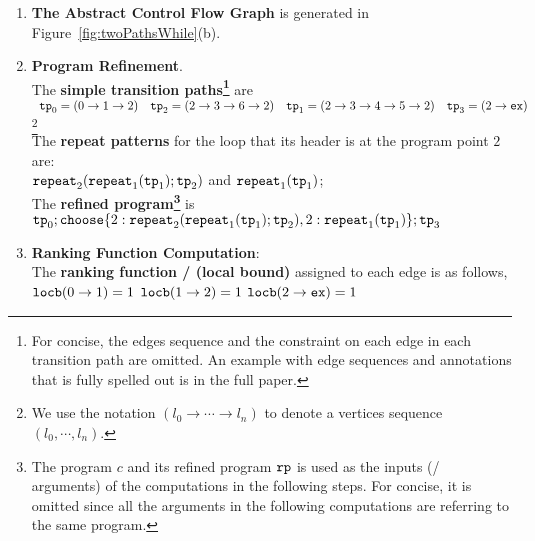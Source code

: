 \begin{enumerate}
  \item  \textbf{The Abstract Control Flow Graph} is generated in Figure~\ref{fig:twoPathsWhile}(b).

  \item \textbf{Program Refinement}. 
  \\
  The \textbf{simple transition paths\footnote{For concise, the edges sequence and the constraint on each edge in
  each transition path are omitted.
  An example with edge sequences and annotations that is fully spelled out is in the full paper.}} are
  \\
$
\begin{array}{llll}
  \mathtt{tp}_0 = (0 \to 1 \to 2)
  &
  \mathtt{tp}_2 = (2 \to 3 \to 6 \to 2)
  &
  \mathtt{tp}_1 = (2 \to 3 \to 4 \to 5 \to 2)
  &
  \mathtt{tp}_3 = (2 \to \mathtt{ex})
  \end{array}
$\footnote{We use the notation $(l_0 \to \cdots \to l_n)$ to denote a vertices sequence $(l_0, \cdots, l_n)$.}
\\
The \textbf{repeat patterns}
for the loop that its header is
at the program point 
$2$ are:
\\
$\mathtt{repeat}_2(\mathtt{repeat}_1(\mathtt{tp}_1); \mathtt{tp}_2) $
and $\mathtt{repeat}_1(\mathtt{tp}_1)$; 
\\
The \textbf{refined program\footnote{The program $c$ and its refined program $\mathtt{rp}$ is used as the inputs (/ arguments) of the computations in the following steps.
For concise, it is omitted since all the arguments in the following computations are referring to the same program.}} is
\\
$
  \tpath_0 ; \rpchoose{2: \rprepeat_2(\rprepeat_1(\tpath_1); \tpath_2) , 
  2: \rprepeat_1(\tpath_1) }; \tpath_3
$
\item \textbf{Ranking Function Computation}:
\\
  The \textbf{ranking function / (local bound)}  assigned to each edge is as follows,
    \\  
      $\mathtt{locb}(0 \to 1) = 1$ 
      \quad
      $\mathtt{locb}(1 \to 2) = 1$ 
      \quad
      $\mathtt{locb}(2 \to \mathtt{ex}) = 1$ 

\end{enumerate}
